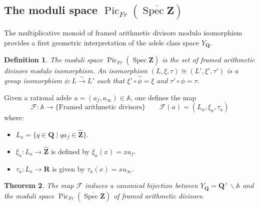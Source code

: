 \documentclass[11pt,a4paper]{article}
\newcommand{\Q}{\mathbf{Q}}
\newcommand{\Z}{\mathbf{Z}}
\newcommand{\R}{\mathbf{R}}
\newcommand{\A}{\mathbb{A}}
\def\spzb{\overline{\Spec \Z}}
\newcommand{\Spec}{\operatorname{Spec}}
\def\MFr{\operatorname{Pic}_{Fr}}
\theoremstyle{plain}
\newtheorem{thm}{Theorem}[section]
\newtheorem{defn}[thm]{Definition}
\theoremstyle{definition} %
\begin{document}
\subsection{The moduli space $\MFr(\spzb)$}

The multiplicative monoid of framed arithmetic divisors modulo isomorphism provides a first geometric interpretation of the adele class space $Y_\Q$.

\begin{defn}\label{moduli} The moduli space $\MFr(\spzb)$   is the set of framed arithmetic divisors modulo isomorphism. An isomorphism  $(L, \xi, \tau)\cong (L', \xi', \tau')$ is a group isomorphism $\phi: L \xrightarrow{\sim} L'$ such that $\xi' \circ \widehat{\phi} = \xi$ and $\tau' \circ \phi = \tau$.
\end{defn}

Given a rational adele $a = (a_f, a_\infty) \in \A$, one defines the map  $$\mathcal{F}: \A \longrightarrow \{ \text{Framed arithmetic divisors} \}\qquad \mathcal{F}(a) = (L_a, \xi_a, \tau_a)$$
where:
\begin{itemize}[leftmargin=*, labelindent=0pt]
    \item[-] $L_a = \{ q \in \Q \mid q a_f \in \widehat{\Z} \}$.
    \item[-] $\xi_a: L_a \to \widehat{\Z}$ is defined by $\xi_a(x) = x a_f$.
    \item[-] $\tau_a: L_a \to \R$ is given by $\tau_a(x) = x a_\infty$.
\end{itemize}

\begin{thm}
The map $\mathcal{F}$ induces a canonical bijection between  $Y_\Q = \Q^\times \backslash \A$ and the moduli space $\MFr(\spzb)$ of framed arithmetic divisors.
\end{thm}
\end{document}
